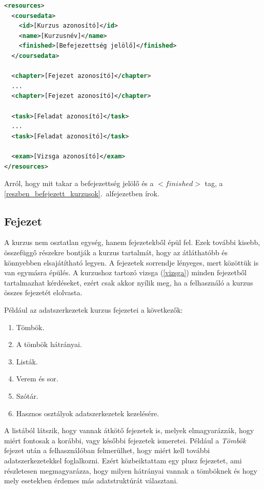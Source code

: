 \documentclass[12pt,a4paper]{article}
\begin{document}
	\bigskip
	\begin{lstlisting}[language=XML]
<resources>
  <coursedata>
    <id>[Kurzus azonosító]</id>
    <name>[Kurzusnév]</name>
    <finished>[Befejezettség jelölő]</finished>
  </coursedata>
  
  <chapter>[Fejezet azonosító]</chapter>
  ...
  <chapter>[Fejezet azonosító]</chapter>
  
  <task>[Feladat azonosító]</task>
  ...
  <task>[Feladat azonosító]</task>
  
  <exam>[Vizsga azonosító]</exam>
</resources>
	\end{lstlisting}
	\bigskip
	
	Arról, hogy mit takar a befejezettség jelölő és a $<finished>$ tag, a \ref{reszben_befejezett_kurzusok}.\ alfejezetben írok.
	
	\subsection{Fejezet}\label{fejezet}
	
	A kurzus nem osztatlan egység, hanem fejezetekből épül fel. Ezek további kisebb, összefüggő részekre bontják a kurzus tartalmát, hogy az átláthatóbb és könnyebben elsajátítható legyen. A fejezetek sorrendje lényeges, mert közöttük is van egymásra épülés. A kurzushoz tartozó vizsga (\ref{vizsga}) minden fejezetből tartalmazhat kérdéseket, ezért csak akkor nyílik meg, ha a felhasználó a kurzus összes fejezetét elolvasta.
	
	Például az adatszerkezetek kurzus fejezetei a következők:
	
	\begin{enumerate}
		\item Tömbök.
		\item A tömbök hátrányai.
		\item Listák.
		\item Verem és sor.
		\item Szótár.
		\item Hasznos osztályok adatszerkezetek kezelésére.
	\end{enumerate}  

	A listából látszik, hogy vannak átkötő fejezetek is, melyek elmagyarázzák, hogy miért fontosak a korábbi, vagy későbbi fejezetek ismeretei. Például a \textit{Tömbök} fejezet után a felhasználóban felmerülhet, hogy miért kell további adatszerkezetekkel foglalkozni. Ezért közbeiktattam egy plusz fejezetet, ami részletesen megmagyarázza, hogy milyen hátrányai vannak a tömböknek és hogy mely esetekben érdemes más adatstruktúrát választani.
	
\end{document}
